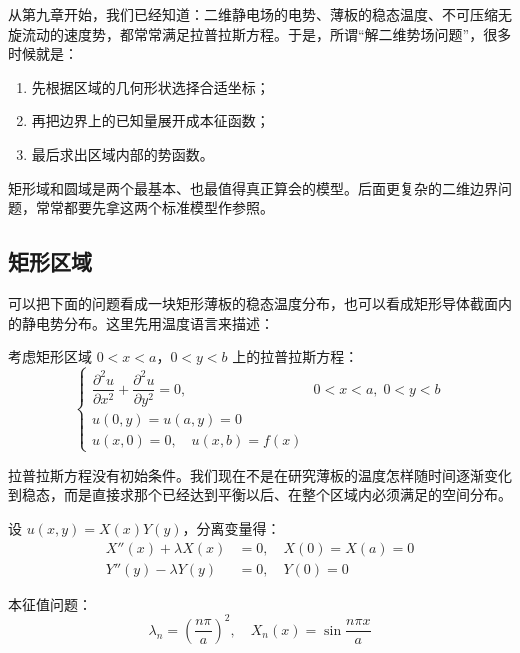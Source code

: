 \begin{wulibj}[这一节在解什么问题]
从第九章开始，我们已经知道：二维静电场的电势、薄板的稳态温度、不可压缩无旋流动的速度势，都常常满足拉普拉斯方程。于是，所谓``解二维势场问题''，很多时候就是：
\begin{enumerate}
    \item 先根据区域的几何形状选择合适坐标；
    \item 再把边界上的已知量展开成本征函数；
    \item 最后求出区域内部的势函数。
\end{enumerate}

矩形域和圆域是两个最基本、也最值得真正算会的模型。后面更复杂的二维边界问题，常常都要先拿这两个标准模型作参照。
\end{wulibj}

\subsection{矩形区域}

可以把下面的问题看成一块矩形薄板的稳态温度分布，也可以看成矩形导体截面内的静电势分布。这里先用温度语言来描述：

考虑矩形区域 $0 < x < a$，$0 < y < b$ 上的拉普拉斯方程：
\begin{equation}
    \begin{cases}
        \dfrac{\partial^2 u}{\partial x^2} + \dfrac{\partial^2 u}{\partial y^2} = 0, & 0 < x < a, \; 0 < y < b \\
        u(0, y) = u(a, y) = 0 \\
        u(x, 0) = 0, \quad u(x, b) = f(x)
    \end{cases}
\end{equation}

\begin{tishi}
拉普拉斯方程没有初始条件。我们现在不是在研究薄板的温度怎样随时间逐渐变化到稳态，而是直接求那个已经达到平衡以后、在整个区域内必须满足的空间分布。
\end{tishi}

设 $u(x, y) = X(x)Y(y)$，分离变量得：
\begin{align}
    X''(x) + \lambda X(x) &= 0, \quad X(0) = X(a) = 0 \\
    Y''(y) - \lambda Y(y) &= 0, \quad Y(0) = 0
\end{align}

本征值问题：
\begin{equation}
    \lambda_n = \left(\frac{n\pi}{a}\right)^2, \quad X_n(x) = \sin\frac{n\pi x}{a}
\end{equation}

